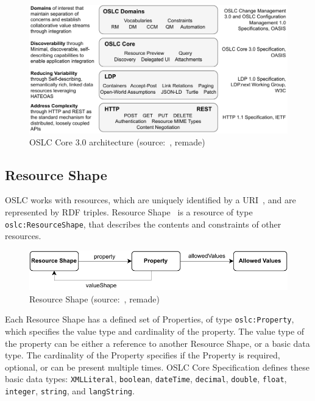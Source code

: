 \begin{figure}[hbt]
  \centering
  \includegraphics[width= \linewidth]{figures/OSLC-core.pdf}
  \caption{OSLC Core 3.0 architecture (source: \cite{oslc_core_specification}, remade)}
  \label{fig:oslc_core_architecture}
\end{figure}

\subsection*{Resource Shape}
OSLC works with resources, which are uniquely identified by a URI \cite{uri_rfc}, and are represented by RDF triples. Resource Shape \cite{oslc_core_resource_shape} is a resource of type \texttt{oslc:ResourceShape}, that describes the contents and constraints of other resources.

\begin{figure}[hbt]
  \centering
  \includegraphics[width=.8 \linewidth]{figures/resource-shape.pdf}
  \caption{Resource Shape (source: \cite{oslc_core_resource_shape}, remade)}
  \label{fig:resource_shape}
\end{figure}

Each Resource Shape has a defined set of Properties, of type \texttt{oslc:Property}, which specifies the value type and cardinality of the property. The value type of the property can be either a reference to another Resource Shape, or a basic data type. The cardinality of the Property specifies if the Property is required, optional, or can be present multiple times. OSLC Core Specification defines these basic data types: \texttt{XMLLiteral}, \texttt{boolean}, \texttt{dateTime}, \texttt{decimal}, \texttt{double}, \texttt{float}, \texttt{integer}, \texttt{string}, and \texttt{langString}.


